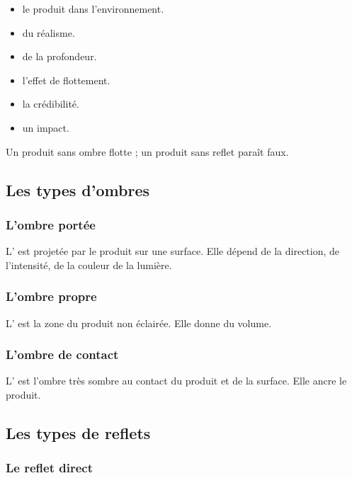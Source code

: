 \begin{itemize}
    \item {} le produit dans l'environnement.
    \item {} du réalisme.
    \item {} de la profondeur.
    \item {} l'effet de flottement.
    \item {} la crédibilité.
    \item {} un impact.
\end{itemize}

Un produit sans ombre flotte ; un produit sans reflet paraît faux.

\subsection{Les types d'ombres}

\subsubsection{L'ombre portée}

L' est projetée par le produit sur une surface. Elle dépend de la direction, de l'intensité, de la couleur de la lumière.

\subsubsection{L'ombre propre}

L' est la zone du produit non éclairée. Elle donne du volume.

\subsubsection{L'ombre de contact}

L' est l'ombre très sombre au contact du produit et de la surface. Elle ancre le produit.

\subsection{Les types de reflets}

\subsubsection{Le reflet direct}

